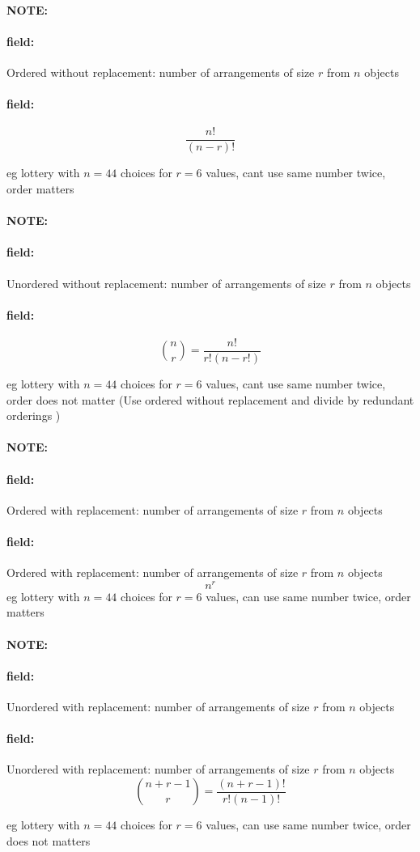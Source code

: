 \documentclass[12pt]{article}
\newenvironment{note}{\paragraph{NOTE:}}{}
\newenvironment{field}{\paragraph{field:}}{}
\begin{document}
\begin{note}
    \begin{field}
        Ordered without replacement: number of arrangements of size $r$ from $n$ objects
    \end{field}
    \begin{field}
        $$\frac{n!}{(n-r)!}$$

        eg lottery with $n=44$ choices for $r=6$ values, cant use same number twice, order matters
    \end{field}
\end{note}

\begin{note}
    \begin{field}
        Unordered without replacement: number of arrangements of size $r$ from $n$ objects
      \end{field}
    \begin{field}
        $$\binom{n}{r} = \frac{n!}{r!(n-r!)}$$

        eg lottery with $n=44$ choices for $r=6$ values, cant use same number twice, order does not matter (Use ordered without replacement and divide by redundant orderings )
    \end{field}
\end{note}


\begin{note}
    \begin{field}
        Ordered with replacement: number of arrangements of size $r$ from $n$ objects
    \end{field}
    \begin{field}
      Ordered with replacement: number of arrangements of size $r$ from $n$ objects
        $$n^r$$
        eg lottery with $n=44$ choices for $r=6$ values, can use same number twice, order matters
    \end{field}
\end{note}

\begin{note}
    \begin{field}
        Unordered with replacement: number of arrangements of size $r$ from $n$ objects
    \end{field}
    \begin{field}
      Unordered with replacement: number of arrangements of size $r$ from $n$ objects
        $$\binom{n+r-1}{r} = \frac{(n+r-1)!}{r!(n-1)!}$$

        eg lottery with $n=44$ choices for $r=6$ values, can use same number twice, order does not matters
    \end{field}
\end{note}
\end{document}
